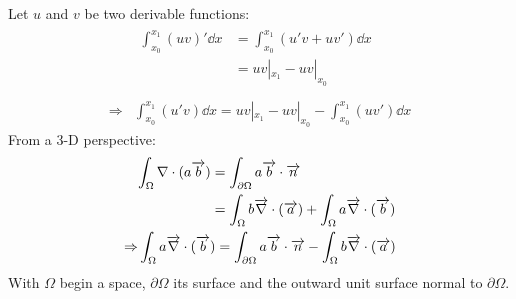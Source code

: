 Let $u$ and $v$ be two derivable functions:
\begin{equation}
\begin{split}
 & \begin{split}
        \int_{x_0}^{x_1}\left(u v\right)'\dd x & = \int_{x_0}^{x_1}\left(u' v + u v' \right)\dd x \\
                                               & = u v|_{x_1} - u v|_{x_0} \\
   \end{split}\\
\Rightarrow &
 \int_{x_0}^{x_1}\left(u' v\right) \dd x = u v|_{x_1} - u v|_{x_0} - \int_{x_0}^{x_1}\left( u v'\right) \dd x
\end{split}
\label{sec:math:ipp}
\end{equation}
From a 3-D perspective:
\begin{equation}
\begin{split}
 & \begin{split}
     \int_\Omega \nabla\cdot(a\overrightarrow{b}) & = \int_{\partial\Omega}a\overrightarrow{b}\cdot\overrightarrow{n} \\
                                        & = \int_{\Omega}b\overrightarrow{\nabla}\cdot(\overrightarrow{a}) + \int_\Omega a\overrightarrow{\nabla}\cdot(\overrightarrow{b})
   \end{split} \\
\Rightarrow &
\int_\Omega a\overrightarrow{\nabla}\cdot(\overrightarrow{b}) = \int_{\partial\Omega}a\overrightarrow{b}\cdot\overrightarrow{n} - \int_{\Omega}b\overrightarrow{\nabla}\cdot(\overrightarrow{a})
\end{split}
\label{sec:math:ipp_3D}
\end{equation}
With $\Omega$ begin a space, $\partial\Omega$ its surface and  the outward unit
surface normal to $\partial\Omega$.

